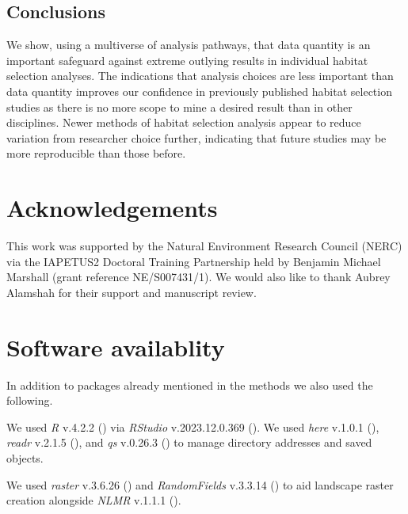 \documentclass[10pt,a4paper]{article}
\begin{document}
\subsection{Conclusions}\label{conclusions}

We show, using a multiverse of analysis pathways, that data quantity is an important safeguard against extreme outlying results in individual habitat selection analyses.
The indications that analysis choices are less important than data quantity improves our confidence in previously published habitat selection studies as there is no more scope to mine a desired result than in other disciplines.
Newer methods of habitat selection analysis appear to reduce variation from researcher choice further, indicating that future studies may be more reproducible than those before.

\clearpage

\section{Acknowledgements}\label{acknowledgements}

This work was supported by the Natural Environment Research Council (NERC) via the IAPETUS2 Doctoral Training Partnership held by Benjamin Michael Marshall (grant reference NE/S007431/1).
We would also like to thank Aubrey Alamshah for their support and manuscript review.

\section{Software availablity}\label{software-availablity}

In addition to packages already mentioned in the methods we also used the following.

We used \emph{R} v.4.2.2 () via \emph{RStudio} v.2023.12.0.369 ().
We used \emph{here} v.1.0.1 (), \emph{readr} v.2.1.5 (), and \emph{qs} v.0.26.3 () to manage directory addresses and saved objects.

We used \emph{raster} v.3.6.26 () and \emph{RandomFields} v.3.3.14 () to aid landscape raster creation alongside \emph{NLMR} v.1.1.1 ().
\end{document}
